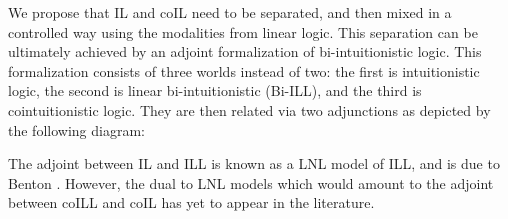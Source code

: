 We propose that IL and coIL need to be separated, and then mixed in a
controlled way using the modalities from linear logic.  This
separation can be ultimately achieved by an adjoint formalization of
bi-intuitionistic logic.  This formalization consists of three worlds
instead of two: the first is intuitionistic logic, the second is
linear bi-intuitionistic (Bi-ILL), and the third is cointuitionistic
logic.  They are then related via two adjunctions as depicted by the
following diagram:
\begin{center}
    
\end{center}
The adjoint between IL and ILL is known as a LNL model of ILL, and is
due to Benton \cite{Benton:1994}.  However, the dual to LNL models
which would amount to the adjoint between coILL and coIL has yet to
appear in the literature.

